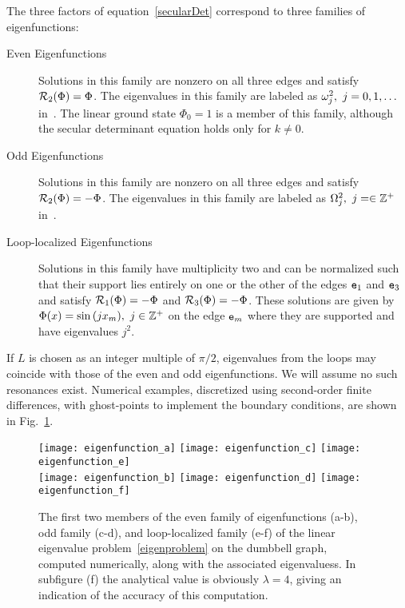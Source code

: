\documentclass{article}
\numberwithin{equation}{section}
\numberwithin{figure}{section}
\begin{document}
The three factors of equation~\eqref{secularDet} correspond to three families of eigenfunctions:
\begin{description}
%
\item[Even Eigenfunctions]
Solutions in this family are nonzero on all three edges and satisfy $\mathcal{R}_2(\Phi) = \Phi$. The eigenvalues in this family are labeled as $\omega_j^2, \ j= 0,1,\ldots$ in~\cite{Marzuola:2016bl}. The linear ground state $\Phi_0=1$ is a member of this family, although the secular determinant equation holds only for $k\neq0$.
%
\item[Odd Eigenfunctions] Solutions in this family are nonzero on all three edges and satisfy $\mathcal{R}_2(\Phi) = -\Phi$. The eigenvalues in this family are labeled as $\Omega_j^2, \ j= \in \mathbb{Z}^+$ in~\cite{Marzuola:2016bl}.
%
\item[Loop-localized Eigenfunctions] Solutions in this family have multiplicity two and can be normalized such that their support lies entirely on one or the other of the  edges  $\mathtt{e}_1$ and $\mathtt{e}_3$ and satisfy $\mathcal{R}_1(\Phi)=-\Phi$ and $\mathcal{R}_3(\Phi)=-\Phi$. These solutions are given by $\Phi(x) = \sin{(j x_m)}, \ j\in \mathbb{Z}^+$ on the edge $\mathtt{e}_m$ where they are supported and have eigenvalues $j^2$.
\end{description} 
 If $L$ is chosen as an integer multiple of $\pi/2$, eigenvalues from the loops may coincide with those of the even and odd eigenfunctions. We will assume no such resonances exist. Numerical examples, discretized using second-order finite differences, with ghost-points to implement the boundary conditions, are shown in Fig.~\ref{fig:dumbbellEigs}.
\begin{figure}[htbp] %
   \centering
   \texttt{[image: eigenfunction\_a]} 
   \texttt{[image: eigenfunction\_c]} 
   \texttt{[image: eigenfunction\_e]} 
   \\
   \texttt{[image: eigenfunction\_b]} 
   \texttt{[image: eigenfunction\_d]} 
   \texttt{[image: eigenfunction\_f]} 
   \caption{The first two members of the even family of eigenfunctions (a-b), odd family (c-d), and loop-localized family (e-f) of the linear eigenvalue problem~\eqref{eigenproblem} on the dumbbell graph, computed numerically, along with the associated eigenvaluess. In subfigure (f) the analytical value is obviously $\lambda=4$, giving an indication of the accuracy of this computation.}
\label{fig:dumbbellEigs}
\end{figure}
 
\end{document}

